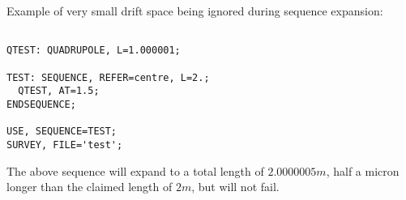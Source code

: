 Example of very small drift space being ignored during sequence
expansion: 
\begin{verbatim}

QTEST: QUADRUPOLE, L=1.000001;
 
TEST: SEQUENCE, REFER=centre, L=2.;
  QTEST, AT=1.5;	 
ENDSEQUENCE;	 

USE, SEQUENCE=TEST;
SURVEY, FILE='test';

\end{verbatim}
The above sequence will expand to a total length of $2.0000005 m$, half
a micron longer than the claimed length of $2 m$, but will not fail.
